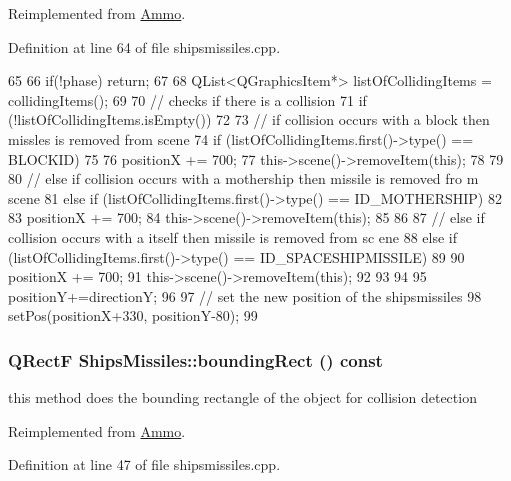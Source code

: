 Reimplemented from \hyperlink{class_ammo_a257fb0cdbb4302da65b89447fa6caeaa}{Ammo}.

Definition at line 64 of file shipsmissiles.cpp.


\begin{DoxyCode}
65 {
66     if(!phase) return;
67 
68     QList<QGraphicsItem*> listOfCollidingItems = collidingItems();
69 
70     // checks if there is a collision
71     if (!listOfCollidingItems.isEmpty())
72     {
73         // if collision occurs with a block then missles is removed from scene
74         if (listOfCollidingItems.first()->type() == BLOCKID)
75         {
76             positionX += 700;
77             this->scene()->removeItem(this);
78         }
79 
80         // else if collision occurs with a mothership then missile is removed fro
      m scene
81         else if (listOfCollidingItems.first()->type() == ID_MOTHERSHIP)
82         {
83             positionX += 700;
84             this->scene()->removeItem(this);
85         }
86 
87         // else if collision occurs with a itself then missile is removed from sc
      ene
88         else if (listOfCollidingItems.first()->type() == ID_SPACESHIPMISSILE)
89         {
90             positionX += 700;
91             this->scene()->removeItem(this);
92         }
93     }
94 
95     positionY+=directionY;
96 
97     // set the new position of the shipsmissiles
98     setPos(positionX+330, positionY-80);
99 }
\end{DoxyCode}
\hypertarget{class_ships_missiles_a0f26573f2bf4eed4c4320d09b1384c49}{
\subsubsection[{boundingRect}]{\setlength{\rightskip}{0pt plus 5cm}QRectF ShipsMissiles::boundingRect () const}}
\label{class_ships_missiles_a0f26573f2bf4eed4c4320d09b1384c49}
this method does the bounding rectangle of the object for collision detection 

Reimplemented from \hyperlink{class_ammo_a4c5548e35a4599210f0599328ef03f01}{Ammo}.

Definition at line 47 of file shipsmissiles.cpp.


